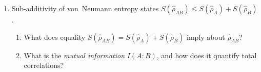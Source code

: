 \documentclass[11pt,a4paper]{article}
\begin{document}
\begin{tcolorbox}[gradconceptbox, title={Part I --- Structural Concept Probes \hfill\normalfont 5 $\times$ 2 pts = 10 pts}]
\begin{enumerate}[leftmargin=1.8em, label=\textbf{Q\arabic*.}, itemsep=10pt]
  \vspace{2.5cm}

\item {}
  Sub-additivity of von~Neumann entropy states $S(\hat{\rho}_{AB})\le S(\hat{\rho}_A)+S(\hat{\rho}_B)$.
  \begin{enumerate}[label=(\alph*)]
    \item What does equality $S(\hat{\rho}_{AB})=S(\hat{\rho}_A)+S(\hat{\rho}_B)$ imply about $\hat{\rho}_{AB}$?
    \item What is the \emph{mutual information} $I(A:B)$, and how does it quantify total correlations?
  \end{enumerate}

  \vspace{2.5cm}

\end{enumerate}
\end{tcolorbox}
\end{document}
